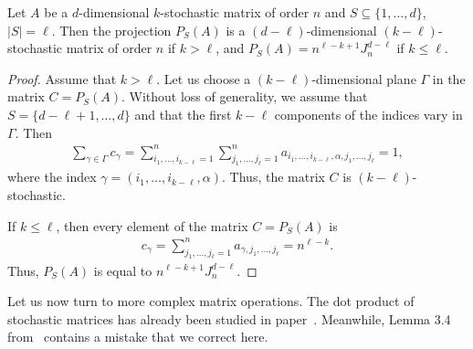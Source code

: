 \documentclass[a4paper]{article}
\begin{document}
\begin{teorema}
Let $A$ be a $d$-dimensional $k$-stochastic matrix of order $n$ and $S \subseteq \{ 1, \ldots, d\}$, $|S| = \ell$. Then the projection $ P_S(A)$ is a $(d - \ell)$-dimensional $(k - \ell)$-stochastic matrix of order $n$ if $k > \ell$, and $P_S(A) = n^{\ell - k+1} J_n^{d-\ell}$ if $k \leq \ell$. 
\end{teorema}

\begin{proof}
Assume that $k > \ell$.
Let us choose a $(k - \ell)$-dimensional plane $\Gamma$ in the matrix $C = P_S(A)$. Without loss of generality, we assume that $S = \{d - \ell +1, \ldots, d \}$ and that  the first $k - \ell$ components of the indices vary  in $\Gamma$. Then 
\begin{gather*}
\sum \limits_{\gamma \in \Gamma} c_\gamma = \sum\limits_{i_1, \ldots ,i_{k - \ell} = 1}^n  \sum\limits_{j_1, \ldots, j_\ell =1}^n  a_{i_1, \ldots ,i_{k-\ell}, \alpha, j_1, \ldots, j_\ell}  = 1,
 \end{gather*}
 where the index $\gamma = (i_1, \ldots, i_{k-\ell}, \alpha)$.
Thus, the matrix $C$ is  $(k - \ell)$-stochastic.

If $k \leq \ell$, then every element of the matrix $C = P_S(A)$ is
\begin{gather*}
 c_\gamma =  \sum\limits_{j_1, \ldots, j_\ell =1}^n  a_{\gamma, j_1, \ldots, j_\ell}  = n^{\ell - k}.
 \end{gather*}
 Thus, $P_S(A)$ is equal to  $n^{\ell - k+1} J_n^{d-\ell}$.
\end{proof}


Let us now turn to  more complex matrix operations. 
The dot product of stochastic matrices  has already been studied in paper~\cite{ChildWan.multper}. Meanwhile,  Lemma 3.4 from~\cite{ChildWan.multper}  contains a   mistake that we correct here. 
\end{document}
